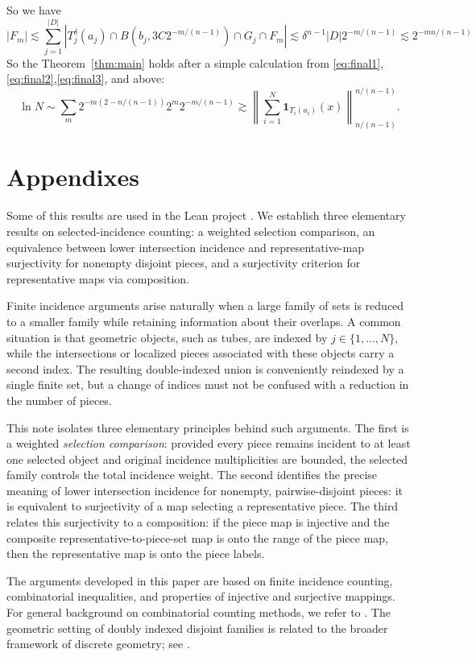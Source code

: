 \documentclass[11pt, letterpaper]{nyjm}
\begin{document}
	So we have 
	\begin{equation}
		|F_m| \lesssim \sum_ {j=1}^{|D|}|T^\delta_j(a_j) \cap B(b_{j},3C2^{-m/(n-1)}) \cap G_j \cap F_m| \lesssim \delta^{n-1}|D|2^{-m/(n-1)} \lesssim 2^{-mn/(n-1)} 
	\end{equation}
	So the Theorem~\ref{thm:main} holds after a simple calculation from \eqref{eq:final1}, \eqref{eq:final2},\eqref{eq:final3}, and above:
	\[
	\ln N \sim \sum_m 2^{-m(2-n/(n-1))} 2^{m}2^{-m/(n-1)}
	\gtrsim \left\| \sum_{i=1}^{N} \mathbf{1}_{T_i(a_i)}(x)
	\right\|_{n/(n-1)}^{n/(n-1)}.
	\] 
	
	\section{Appendixes}
	\appendix
	Some of this results are used in the Lean project \cite{Aspegren2026Lean}.
	We establish three elementary results on selected-incidence counting: a weighted selection comparison, an equivalence between lower intersection incidence and representative-map surjectivity for nonempty disjoint pieces, and a surjectivity criterion for representative maps via composition. 
	
	Finite incidence arguments arise naturally when a large family of sets is
	reduced to a smaller family while retaining information about their
	overlaps. A common situation is that geometric objects, such as tubes,
	are indexed by $j\in\{1,\ldots,N\}$, while the intersections or localized
	pieces associated with these objects carry a second index.  The resulting
	double-indexed union is conveniently reindexed by a single finite set,
	but a change of indices must not be confused with a reduction in the
	number of pieces.
	
	This note isolates three elementary principles behind such arguments.
	The first is a weighted \emph{selection comparison}: provided every
	piece remains incident to at least one selected object and original
	incidence multiplicities are bounded, the selected family controls the
	total incidence weight. The second identifies the precise meaning of
	lower intersection incidence for nonempty, pairwise-disjoint pieces:
	it is equivalent to surjectivity of a map selecting a representative
	piece. The third relates this surjectivity to a composition: if the
	piece map is injective and the composite representative-to-piece-set
	map is onto the range of the piece map, then the representative map is
	onto the piece labels.
	
	The arguments developed in this paper are based on
	finite incidence counting, combinatorial inequalities,
	and properties of injective and surjective mappings.
	For general background on combinatorial counting
	methods, we refer to \cite{vanLintWilson}.
	The geometric setting of doubly indexed disjoint
	families is related to the broader framework of
	discrete geometry; see \cite{Matousek}.
	
\end{document}
